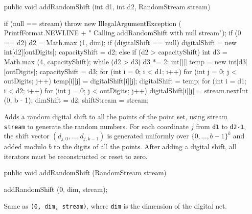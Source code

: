 \begin{code}

   public void addRandomShift (int d1, int d2, RandomStream stream)\begin{hide} {
      if (null == stream)
         throw new IllegalArgumentException (
              PrintfFormat.NEWLINE +
              "   Calling addRandomShift with null stream");
      if (0 == d2)
         d2 = Math.max (1, dim);
      if (digitalShift == null) {
         digitalShift = new int[d2][outDigits];
         capacityShift = d2;
      } else if (d2 > capacityShift) {
         int d3 = Math.max (4, capacityShift);
         while (d2 > d3)
            d3 *= 2;
         int[][] temp = new int[d3][outDigits];
         capacityShift = d3;
         for (int i = 0; i < d1; i++)
            for (int j = 0; j < outDigits; j++)
               temp[i][j] = digitalShift[i][j];
         digitalShift = temp;
      }
      for (int i = d1; i < d2; i++)
         for (int j = 0; j < outDigits; j++)
            digitalShift[i][j] = stream.nextInt (0, b - 1);
      dimShift = d2;
      shiftStream = stream;
     }\end{hide}
\end{code}
\begin{tabb}  Adds a random digital shift to all the points of the point set,
  using stream \texttt{stream} to generate the random numbers.
  For each coordinate $j$ from \texttt{d1} to \texttt{d2-1},
  the shift vector $(d_{j,0},\dots,d_{j,k-1})$
  is generated uniformly over $\{0,\dots,b-1\}^k$ and added modulo $b$ to
  the digits of all the points.
  After adding a digital shift, all iterators must be reconstructed or
  reset to zero.
\end{tabb}
\begin{htmlonly}
\end{htmlonly}
\begin{code}

   public void addRandomShift (RandomStream stream)\begin{hide} {
      addRandomShift (0, dim, stream);
     }\end{hide}
\end{code}
\begin{tabb}  Same as \texttt{(0, dim, stream)},
  where \texttt{dim} is the dimension of the digital net.
\end{tabb}
\begin{htmlonly}
\end{htmlonly}
